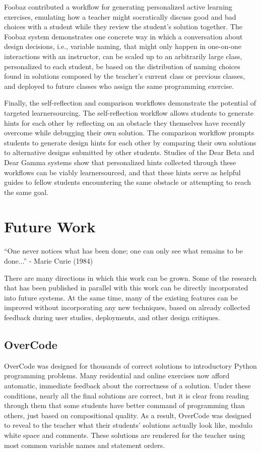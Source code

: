 Foobaz contributed a workflow for generating personalized active learning exercises, emulating how a teacher might socratically discuss good and bad choices with a student while they review the student's solution together. The Foobaz system demonstrates one concrete way in which a conversation about design decisions, i.e., variable naming, that might only happen in one-on-one interactions with an instructor, can be scaled up to an arbitrarily large class, personalized to each student, be based on the distribution of naming choices found in solutions composed by the teacher's current class or previous classes, and deployed to future classes who assign the same programming exercise.

Finally, the self-reflection and comparison workflows demonstrate the potential of targeted learnersourcing. The self-reflection workflow allows students to generate hints for each other by reflecting on an obstacle they themselves have recently overcome while debugging their own solution. The comparison workflow prompts students to generate design hints for each other by comparing their own solutions to alternative designs submitted by other students. Studies of the Dear Beta and Dear Gamma systems show that personalized hints collected through these workflows can be viably learnersourced, and that these hints serve as helpful guides to fellow students encountering the same obstacle or attempting to reach the same goal.

\section{Future Work}
``One never notices what has been done; one can only see what remains to be done...'' - Marie Curie (1984)

There are many directions in which this work can be grown. Some of the research that has been published in parallel with this work can be directly incorporated into future systems. At the same time, many of the existing features can be improved without incorporating any new techniques, based on already collected feedback during user studies, deployments, and other design critiques.

\subsection{OverCode}

OverCode was designed for thousands of correct solutions to introductory Python programming problems. Many residential and online exercises now afford automatic, immediate feedback about the correctness of a solution. Under these conditions, nearly all the final solutions are correct, but it is clear from reading through them that some students have better command of programming than others, just based on compositional quality. As a result, OverCode was designed to reveal to the teacher what their students' solutions actually look like, modulo white space and comments. These solutions are rendered for the teacher using most common variable names and statement orders. 

